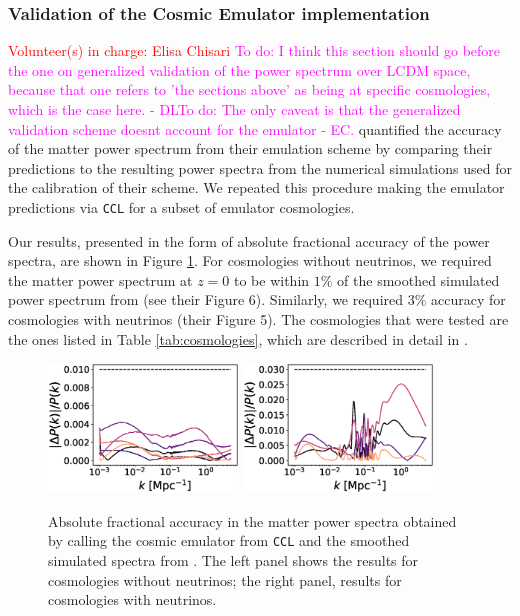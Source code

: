 \documentclass[\docopts]{\docclass}
\newcommand{\todo}[1]{\textcolor{magenta}{To do: #1}}
\newcommand{\vol}[1]{\textcolor{red}{Volunteer(s) in charge: #1}}
\newcommand{\ccl}{{\tt CCL}\xspace}
\begin{document}
\subsubsection{Validation of the Cosmic Emulator implementation}
\vol{Elisa Chisari}
\todo{I think this section should go before the one on generalized validation of the power spectrum over LCDM space, because that one refers to 'the sections above' as being at specific cosmologies, which is the case here. - DL}\todo{The only caveat is that the generalized validation scheme doesnt account for the emulator - EC.}
\citet{Lawrence17} quantified the accuracy of the matter power spectrum from their emulation scheme by comparing their predictions to the resulting power spectra from the numerical simulations used for the calibration of their scheme. We repeated this procedure making the emulator predictions via \ccl for a subset of emulator cosmologies. 

Our results, presented in the form of absolute fractional accuracy of the power spectra, are shown in Figure \ref{fig:emuacc}. For cosmologies without neutrinos, we required the matter power spectrum at $z=0$ to be within $1\%$ of the smoothed simulated power spectrum from \citet{Lawrence17} (see their Figure 6). Similarly, we required $3\%$ accuracy for cosmologies with neutrinos (their Figure 5). The cosmologies that were tested are the ones listed in Table \ref{tab:cosmologies}, which are described in detail in \citet{Lawrence17}.

\begin{figure}
  \centering
  \includegraphics[width=0.45\textwidth]{poweremu.eps}
  \includegraphics[width=0.45\textwidth]{poweremu_nu.eps}
  \caption{Absolute fractional accuracy in the matter power spectra obtained by calling the cosmic emulator from \ccl and the smoothed simulated spectra from \citep{Lawrence17}. The left panel shows the results for cosmologies without neutrinos; the right panel, results for cosmologies with neutrinos.}
  \label{fig:emuacc}
\end{figure}
\end{document}
